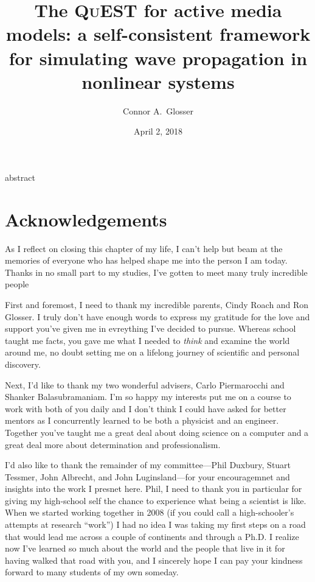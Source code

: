 \documentclass[mixedtoc]{msu-thesis-custom}
\title{The \textsc{QuEST} for active media models: a self-consistent framework for simulating wave propagation in nonlinear systems}
\author{Connor A.\ Glosser}
\date{April 2, 2018}
\begin{document}
\frontmatter
\maketitlepage

{abstract}

\clearpage

\makecopyrightpage


\makededicationpage

\clearpage
\chapter*{Acknowledgements}
\DoubleSpacing %
As I reflect on closing this chapter of my life, I can't help but beam at the
memories of everyone who has helped shape me into the person I am today. Thanks
in no small part to my studies, I've gotten to meet many truly incredible
people


First and foremost, I need to thank my incredible parents, Cindy Roach and Ron
Glosser. I truly don't have enough words to express my gratitude for the love
and support you've given me in evreything I've decided to pursue.  Whereas
school taught me facts, you gave me what I needed to \emph{think} and examine
the world around me, no doubt setting me on a lifelong journey of scientific and
personal discovery.

Next, I'd like to thank my two wonderful advisers, Carlo Piermarocchi and
Shanker Balasubramaniam.  I'm so happy my interests put me on a course to work
with both of you daily and I don't think I could have asked for better mentors
as I concurrently learned to be both a physicist and an engineer. Together
you've taught me a great deal about doing science on a computer and a great
deal more about determination and professionalism.

I'd also like to thank the remainder of my committee---Phil Duxbury, Stuart
Tessmer, John Albrecht, and John Luginsland---for your encouragemnet and
insights into the work I presnet here. Phil, I need to thank you in particular
for giving my high-school self the chance to experience what being a scientist
is like. When we started working together in 2008 (if you could call a
high-schooler's attempts at research ``work'') I had no idea I was taking my
first steps on a road that would lead me across a couple of continents and
through a Ph.D. I realize now I've learned so much about the world and the
people that live in it for having walked that road with you, and I sincerely
hope I can pay your kindness forward to many students of my own someday.
\end{document}
